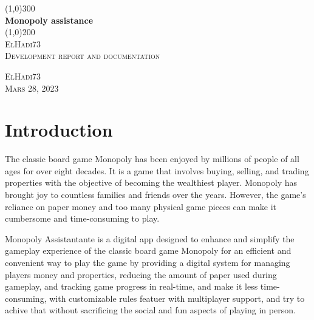 \documentclass{article}
\begin{document}
\begin{titlepage}
	\begin{center}
		\line(1,0){300}\\
		[0.25in]
		\huge{\bfseries Monopoly assistance}\\
		[2mm]
		\line(1,0){200}\\
		[1.5cm]
		\textsc{\LARGE ElHadi73}\\
		[0.75cm]
		\textsc{\Large Development report and documentation}\\
		[10cm]
	\end{center}
	\begin{flushright}
		\textsc{\large ElHadi73\\
		Mars 28, 2023\\}
	\end{flushright}
\end{titlepage}


\cleardoublepage
\tableofcontents
\thispagestyle{empty}
\cleardoublepage


\setcounter{page}{1}

\section{Introduction}\label{sec:intro}
        The classic board game Monopoly has been enjoyed by millions of people of all ages for over eight decades. It is a game that involves buying, selling, and trading properties with the objective of becoming the wealthiest
player. Monopoly has brought joy to countless families and friends over the years. However, the game's reliance on paper money and too many physical game pieces can make it cumbersome and time-consuming to play.

        Monopoly Assistantante is a digital app designed to enhance and simplify the gameplay experience of the classic board game Monopoly for an efficient and convenient way to play the game by providing a digital system for managing players money and properties, reducing the amount of paper used during gameplay, and tracking game progress in real-time, and make it less time-consuming, with customizable rules featuer with multiplayer support, and try to achive that without sacrificing the social and fun aspects of playing in person. 
\end{document}
